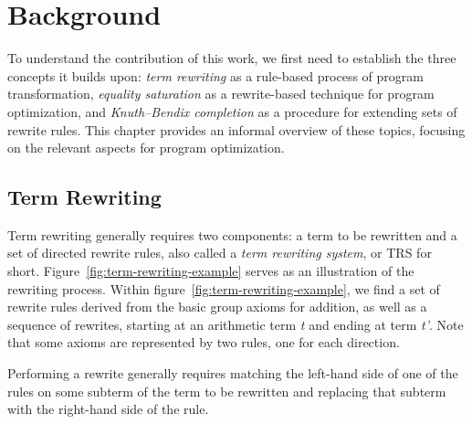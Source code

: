 \chapter{Background}
\label{chap:background}

To understand the contribution of this work, we first need to establish the three concepts it builds upon: \emph{term rewriting} as a rule-based process of program transformation, \emph{equality saturation} as a rewrite-based technique for program optimization, and \emph{Knuth–Bendix completion} as a procedure for extending sets of rewrite rules. This chapter provides an informal overview of these topics, focusing on the relevant aspects for program optimization.

\section{Term Rewriting}
\label{sec:term-rewriting}

Term rewriting generally requires two components: a term to be rewritten and a set of directed rewrite rules, also called a \emph{term rewriting system}, or TRS  for short. Figure~\ref{fig:term-rewriting-example} serves as an illustration of the rewriting process. Within figure~\ref{fig:term-rewriting-example}, we find a set of rewrite rules derived from the basic group axioms for addition, as well as a sequence of rewrites, starting at an arithmetic term \emph{t} and ending at term \emph{t'}. Note that some axioms are represented by two rules, one for each direction. 

Performing a rewrite generally requires matching the left-hand side of one of the rules on some subterm of the term to be rewritten and replacing that subterm with the right-hand side of the rule.

